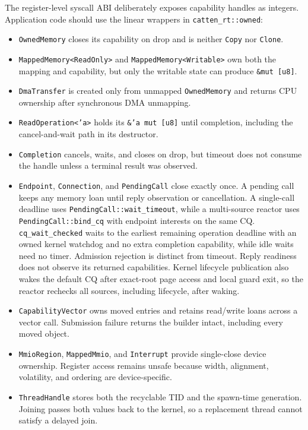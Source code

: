 The register-level syscall ABI deliberately exposes capability handles as
integers. Application code should use the linear wrappers in
\texttt{catten\_rt::owned}:

\begin{itemize}
    \item \texttt{OwnedMemory} closes its capability on drop and is neither
        \texttt{Copy} nor \texttt{Clone}.
    \item \texttt{MappedMemory<ReadOnly>} and
        \texttt{MappedMemory<Writable>} own both the mapping and capability, but
        only the writable state can produce \texttt{\&mut [u8]}.
    \item \texttt{DmaTransfer} is created only from unmapped
        \texttt{OwnedMemory} and returns CPU ownership after synchronous DMA
        unmapping.
    \item \texttt{ReadOperation<'a>} holds its
        \texttt{\&'a mut [u8]} until completion, including the
        cancel-and-wait path in its destructor.
    \item \texttt{Completion} cancels, waits, and closes on drop, but timeout does
        not consume the handle unless a terminal result was observed.
    \item \texttt{Endpoint}, \texttt{Connection}, and \texttt{PendingCall}
        close exactly once. A pending call keeps any memory loan until reply
        observation or cancellation. A single-call deadline uses
        \texttt{PendingCall::}\allowbreak\texttt{wait\_timeout}, while a multi-source reactor uses
        \texttt{PendingCall::bind\_cq} with endpoint interests on the same CQ.
        \texttt{cq\_wait\_checked} waits to the earliest remaining operation
        deadline with an owned kernel watchdog and no extra completion
        capability, while idle waits need no timer. Admission rejection is distinct
        from timeout. Reply readiness does not observe its
        returned capabilities. Kernel lifecycle publication also wakes the
        default CQ after exact-root page access and local guard exit, so the
        reactor rechecks all sources, including lifecycle, after waking.
    \item \texttt{CapabilityVector} owns moved entries and retains read/write
        loans across a vector call. Submission failure returns the builder
        intact, including every moved object.
    \item \texttt{MmioRegion}, \texttt{MappedMmio}, and \texttt{Interrupt}
        provide single-close device ownership. Register access remains unsafe
        because width, alignment, volatility, and ordering are device-specific.
    \item \texttt{ThreadHandle} stores both the recyclable TID and the
        spawn-time generation. Joining passes both values back to the kernel,
        so a replacement thread cannot satisfy a delayed join.
\end{itemize}

